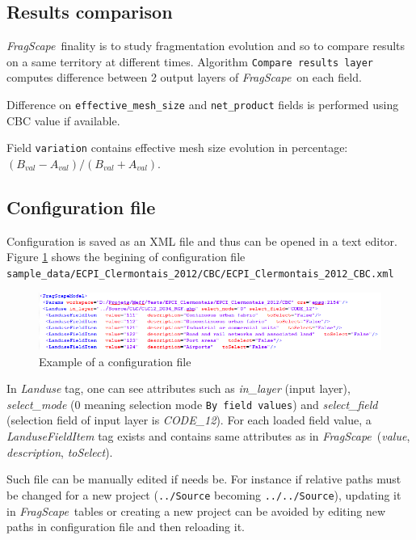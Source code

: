 \documentclass[11pt]{article}
\newcommand{\source}[1]{\vspace*{-0.4cm}\caption*{\textit{Source: {#1}}}}
\newcommand{\tool}{\emph{FragScape}}
\begin{document}
\subsection{Results comparison}
\label{sec:cmp}

\tool\ finality is to study fragmentation evolution and so to compare results on a same territory at different times. Algorithm \texttt{Compare results layer} computes difference between 2 output layers of \tool\ on each field.

Difference on \texttt{effective\_mesh\_size} and \texttt{net\_product} fields is performed using CBC value if available.

Field \texttt{variation} contains effective mesh size evolution in percentage: $(B_{val} - A_{val} ) / (B_{val} + A_{val})$.

\subsection{Configuration file}

Configuration is saved as an XML file and thus can be opened in a text editor. Figure \ref{fig:configFile} shows the begining of configuration file \texttt{sample\_data/ECPI\_Clermontais\_2012/CBC/ECPI\_Clermontais\_2012\_CBC.xml}

\begin{figure}[h!]
    \centering
    \includegraphics[scale=0.8]{pictures/configFile.png}
    \caption{Example of a configuration file}
    \label{fig:configFile}
\end{figure}

In \textit{Landuse} tag, one can see attributes such as \textit{in\_layer} (input layer), \textit{select\_mode} ($0$ meaning selection mode \texttt{By field values}) and \textit{select\_field} (selection field of input layer is \textit{CODE\_12}).
For each loaded field value, a \textit{LanduseFieldItem} tag exists and contains same attributes as in \tool\ (\textit{value}, \textit{description}, \textit{toSelect}).

Such file can be manually edited if needs be. For instance if relative paths must be changed for a new project (\texttt{../Source} becoming \texttt{../../Source}), updating it in \tool\ tables or creating a new project can be avoided by editing new paths in configuration file and then reloading it.
\end{document}
